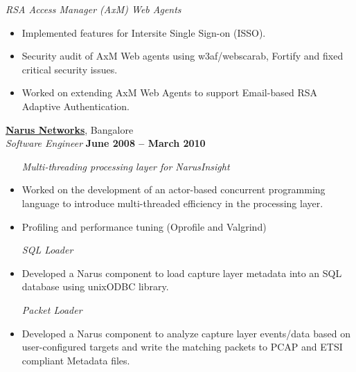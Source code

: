 \documentclass[9pt]{article}
\newcommand{\blankline}{\quad\pagebreak[2]}
\begin{document}
	\textsl{RSA Access Manager (AxM) Web Agents}
	\begin{itemize}
		\item Implemented features for Intersite Single Sign-on (ISSO).%
		\item Security audit of AxM Web agents using w3af/webscarab, Fortify and fixed critical security issues. %
		\item Worked on extending AxM Web Agents to support Email-based RSA Adaptive Authentication. \vspace{0mm}\\\vspace{1mm}%
	\end{itemize}


    \href{http://www.narus.com/}{\textbf{Narus Networks}}, Bangalore \vspace{2mm}\\\vspace{1mm}%
    \textsl{Software Engineer} \hfill \textbf{June 2008 -- March 2010}%
	
	\blankline

	\begin{itemize}
	  \item [\textsl{Multi-threading processing layer for NarusInsight}]
		\item Worked on the development of an actor-based concurrent programming language to introduce multi-threaded efficiency in the processing layer.%
		\item Profiling and performance tuning (Oprofile and Valgrind) %
	\end{itemize}

	\blankline
	
	\begin{itemize}
          \item [\textsl{SQL Loader}]
		\item Developed a Narus component to load capture layer metadata into an SQL database using unixODBC library. %
	\end{itemize}

	\blankline

	\begin{itemize}
	  \item [\textsl{Packet Loader}]
		\item Developed a Narus component to analyze capture layer events/data based on user-configured targets and write the matching packets to PCAP and ETSI compliant Metadata files. \vspace{0mm}\\\vspace{1mm}%
	\end{itemize} 
 
\end{document}
